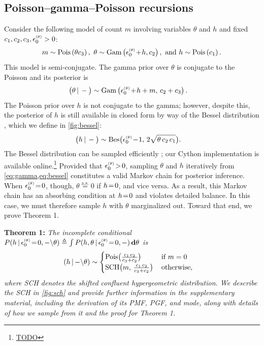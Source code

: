 \documentclass{article}
\begin{document}
\subsection{Poisson--gamma--Poisson recursions}
\label{sec:recursion}
Consider the following model of count $m$ involving variables $\theta$ and $h$ and fixed $c_1, c_2, c_3, \epstheta >0$:
\begin{equation}
m \sim \Pois{\theta c_3},\,\,
%
\theta \sim \Gam{\epstheta \tp h, c_2},\,\,
%
\textrm{and}\,\, h \sim \Pois{c_1}.
\end{equation}
This model is semi-conjugate. The gamma prior over $\theta$ is conjugate to the Poisson and its posterior is
%
\begin{align}
\label{eq:gamma}
\compcond{\theta} &\sim \Gam{\epstheta \tp h + m,\, c_2 + c_3}.
\end{align}
The Poisson prior over $h$ is not conjugate to the gamma; however, despite this, the posterior of $h$ is still available in closed form by way of the Bessel distribution \cite{yuan2000bessel}, which we define in \cref{fig:bessel}:
\begin{align}
\label{eq:bessel}
\compcond{h} &\sim \textrm{Bes}\big(\epstheta \tm 1,\, 2\sqrt{\theta \,c_2\, c_1}\big).
\end{align}
The Bessel distribution can be sampled efficiently \cite{devroye2002simulating}; our Cython implementation is available online.\footnote{\url{TODO}}
Provided that $\epstheta \!>\! 0$, sampling $\theta$ and $h$ iteratively from \cref{eq:gamma,eq:bessel} constitutes a valid Markov chain for posterior inference. When $\epstheta \teq 0$, though, $\theta \stackrel{\textrm{a.s.}}{=} 0$ if $h \!=\! 0$, and vice versa. As a result, this Markov chain has an absorbing condition at $h \!=\! 0$ and violates detailed balance. In this case, we must therefore sample $h$ with $\theta$ marginalized out. Toward that end, we prove Theorem 1.~

\textbf{Theorem 1:} \textit{The incomplete conditional $P(h\given{\epstheta \teq 0, -\backslash} \theta)\triangleq \int P(h,\theta\given \epstheta \teq 0, -)\,\mathbf{d}\theta$ is}~
\begin{align}
\label{eq:sch}
\left(h \,|\, {-\backslash} \theta\right) &\sim
\begin{cases}
\textrm{Pois}\big(\frac{c_1\,c_2}{c_3+c_2}\big) &\textrm{if }m=0\\
\textrm{SCH}\big(m,\, \frac{c_1\,c_2}{c_3+c_2}\big)\, &\textrm{otherwise,}
\end{cases}
\end{align}
\textit{where SCH denotes the shifted confluent hypergeometric distribution. We describe the SCH in \cref{fig:sch} and provide further information in the supplementary material, including the derivation of its PMF, PGF, and mode, along with details of how we sample from it and the proof for Theorem 1.}~
\end{document}
